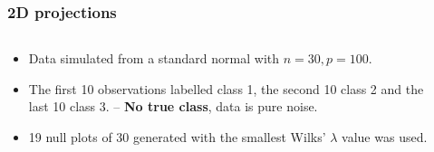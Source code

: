 \documentclass{beamer}
\begin{document}
\begin{frame}
  \frametitle{ 2D projections}
	\begin{columns}
		\begin{column}{0.4\textwidth}
		  \begin{itemize}
			  \item Data simulated from a standard normal with $n=30, p=100$.
			  \item The first 10 observations labelled class 1, the second 10 class 2 and the last 10 class 3. 
			 -- {\bf No true class}, data is pure noise.
			\item 19 null plots of 30 generated with the smallest Wilks' $\lambda$ value was used. 
		  \end{itemize}		
			
		\end{column}
		
		\begin{column}{0.6\textwidth}
			 \begin{center}  \end{center}
		\end{column}
	\end{columns}  
\end{frame} 
\end{document}
